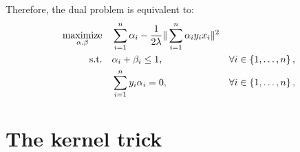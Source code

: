 \documentclass{article}
\newtheorem{theorem}{Theorem}
\DeclareMathOperator*{\maximize}{{\rm maximize}}
\DeclareMathOperator*{\st}{{\rm s.t.}}
\newcommand{\inner}[2]{\left\langle #1,#2 \right\rangle}
\begin{document}
Therefore, the dual problem is equivalent to:
\begin{align}
  \maximize_{\alpha, \beta} \quad & \sum_{i=1}^n \alpha_i - \frac{1}{2\lambda} \|\sum_{i=1}^n \alpha_i y_i x_i\|^2 & \label{eqn:svm-dual} \\
    \st \quad &  \alpha_i + \beta_i \leq 1, &\forall i \in \cbr{1,\ldots,n}, \nonumber \\
    &  \sum_{i=1}^n y_i \alpha_i = 0, &\forall i \in \cbr{1,\ldots,n}, \nonumber
\end{align}

\section{The kernel trick}







%




\end{document}
